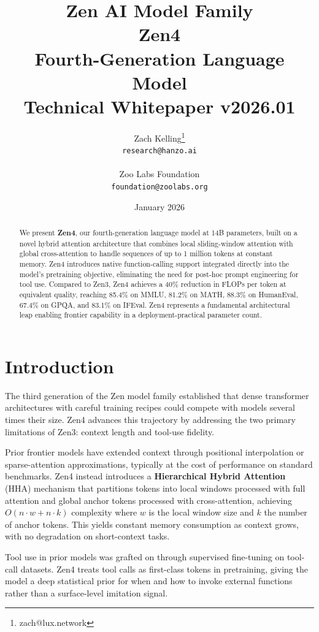 \documentclass[11pt,a4paper]{article}
\title{
    \vspace{-2cm}
    \Large \textbf{Zen AI Model Family} \\
    \vspace{0.5cm}
    \Huge \textbf{Zen4} \\
    \vspace{0.3cm}
    \large Fourth-Generation Language Model \\
    \vspace{0.5cm}
    \normalsize Technical Whitepaper v2026.01
}
\author{
    Zach Kelling\thanks{zach@lux.network} \\
    \texttt{research@hanzo.ai} \\
    \\
    Zoo Labs Foundation \\
    \texttt{foundation@zoolabs.org}
}
\date{January 2026}
\begin{document}
\maketitle

\begin{abstract}
We present \textbf{Zen4}, our fourth-generation language model at 14B parameters, built on a novel hybrid
attention architecture that combines local sliding-window attention with global cross-attention to handle
sequences of up to 1 million tokens at constant memory. Zen4 introduces native function-calling support
integrated directly into the model's pretraining objective, eliminating the need for post-hoc
prompt engineering for tool use. Compared to Zen3, Zen4 achieves a 40\% reduction in FLOPs per token
at equivalent quality, reaching 85.4\% on MMLU, 81.2\% on MATH, 88.3\% on HumanEval, 67.4\% on GPQA,
and 83.1\% on IFEval. Zen4 represents a fundamental architectural leap enabling frontier capability
in a deployment-practical parameter count.
\end{abstract}

\tableofcontents
\newpage

\section{Introduction}

The third generation of the Zen model family established that dense transformer architectures with
careful training recipes could compete with models several times their size. Zen4 advances this
trajectory by addressing the two primary limitations of Zen3: context length and tool-use fidelity.

Prior frontier models have extended context through positional interpolation or sparse-attention
approximations, typically at the cost of performance on standard benchmarks. Zen4 instead introduces
a \textbf{Hierarchical Hybrid Attention} (HHA) mechanism that partitions tokens into local windows
processed with full attention and global anchor tokens processed with cross-attention, achieving
$O(n \cdot w + n \cdot k)$ complexity where $w$ is the local window size and $k$ the number of
anchor tokens. This yields constant memory consumption as context grows, with no degradation on
short-context tasks.

Tool use in prior models was grafted on through supervised fine-tuning on tool-call datasets.
Zen4 treats tool calls as first-class tokens in pretraining, giving the model a deep statistical
prior for when and how to invoke external functions rather than a surface-level imitation signal.
\end{document}
